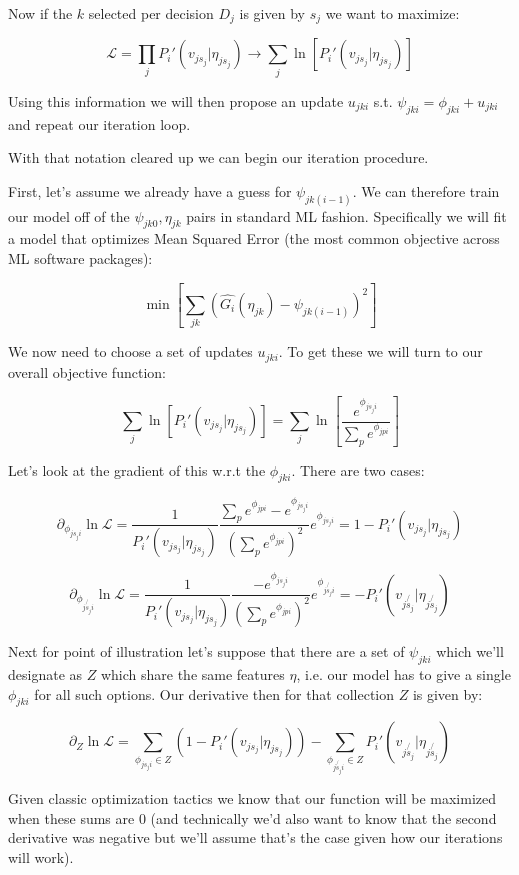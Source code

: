 \documentclass[11pt]{article}
\begin{document}
Now if the $k$ selected per decision $D_j$ is given by $s_j$ we want to maximize:

$$\mathcal{L}=\prod_j P_i'(v_{js_j} | \eta_{js_j})\rightarrow \sum_j \ln{\left[ P_i'(v_{js_j} | \eta_{js_j}) \right]}$$

Using this information we will then propose an update $u_{jki}$ s.t. $\psi_{jki}=\phi_{jki} + u_{jki}$ and repeat our iteration loop. 

With that notation cleared up we can begin our iteration procedure. \newline

First, let's assume we already have a guess for $\psi_{jk(i-1)}$. We can therefore train our model off of the $\psi_{jk0},\eta_{jk}$ pairs in standard ML fashion. Specifically we will fit a model that optimizes Mean Squared Error (the most common objective across ML software packages):

$$\min{\left[ \sum_{jk}\left(\hat{G_i}(\eta_{jk}) - \psi_{jk(i-1)}\right)^2 \right]}$$

We now need to choose a set of updates $u_{jki}$. To get these we will turn to our overall objective function:

$$\sum_j \ln{\left[ P_i'(v_{js_j} | \eta_{js_j}) \right]}= \sum_j \ln{\left[ \frac{e^{\phi_{js_ji}}}{\sum_p e^{\phi_{jpi}}} \right]}$$

Let's look at the gradient of this w.r.t the $\phi_{jki}$. There are two cases:

$$\partial_{\phi_{js_ji}}\ln{\mathcal{L}}
=
\frac{1}{P_i'(v_{js_j} | \eta_{js_j})}\frac{\sum_p e^{\phi_{jpi}}-e^{\phi_{js_ji}}}{\left( \sum_p e^{\phi_{jpi}} \right)^2} e^{\phi_{js_ji}}
=
1-P_i'(v_{js_j} | \eta_{js_j}) $$ 

$$\partial_{\phi_{j\not{s_j}i}}\ln{\mathcal{L}}
=
\frac{1}{P_i'(v_{js_j} | \eta_{js_j})}\frac{-e^{\phi_{js_ji}}}{\left( \sum_p e^{\phi_{jpi}} \right)^2} e^{\phi_{j\not{s_j}i}}
= 
-P_i'(v_{j\not{s_j}} | \eta_{j\not{s_j}})$$ 

Next for point of illustration let's suppose that there are a set of $\psi_{jki}$ which we'll designate as $Z$ which share the same features $\eta$, i.e. our model has to give a single $\phi_{jki}$ for all such options. Our derivative then for that collection $Z$ is given by:

$$\partial_Z \ln{\mathcal{L}}=\sum_{\phi_{js_ji} \in Z}\left(1-P_i'(v_{js_j} | \eta_{js_j}) \right)-\sum_{\phi_{j\not{s_j}i}\in Z}P_i'(v_{j\not{s_j}} | \eta_{j\not{s_j}})$$

Given classic optimization tactics we know that our function will be maximized when these sums are $0$ (and technically we'd also want to know that the second derivative was negative but we'll assume that's the case given how our iterations will work). \newline
\end{document}
